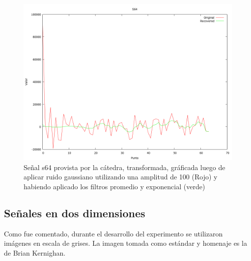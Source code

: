 \begin{figure}
\begin {center}
\includegraphics[width=360pt]{imagenes/s64-gauss100-both-spec.png}
\end {center}
\caption{Se\~nal s64 provista por la c\'atedra, transformada, gr\'aficada
luego de aplicar ruido gaussiano utilizando una amplitud de 100 (Rojo) y 
habiendo aplicado los filtros promedio y exponencial (verde)}
\label{fig:SinProm}
\end{figure}


\subsection{Se\~nales en dos dimensiones}

Como fue comentado, durante el desarrollo del experimento se utilizaron
im\'agenes en escala de grises. La imagen tomada como est\'andar y homenaje es 
la de Brian Kernighan.

